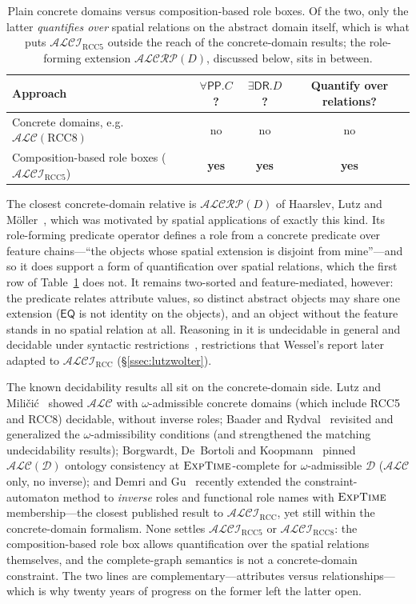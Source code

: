 \documentclass[11pt]{article}
\newcommand{\ALCIRCC}[1]{\mathcal{ALCI}_{\mathrm{RCC#1}}}
\newcommand{\DR}{\mathsf{DR}}
\newcommand{\PP}{\mathsf{PP}}
\newcommand{\EQ}{\mathsf{EQ}}
\newcommand{\EXPTIME}{\textsc{ExpTime}}
\newcommand{\ALC}{\ensuremath{\mathcal{ALC}}}
\theoremstyle{plain}
\theoremstyle{definition}
\begin{document}
\begin{table}[t]
\centering
\small
\renewcommand{\arraystretch}{1.2}
\begin{tabular}{@{}lccc@{}}
\toprule
Approach & $\forall\PP.C$? & $\exists\DR.D$? & Quantify over relations? \\
\midrule
Concrete domains, e.g.\ $\ALC(\text{RCC8})$ & no & no & no \\
Composition-based role boxes ($\ALCIRCC5$) & \textbf{yes} & \textbf{yes} & \textbf{yes} \\
\bottomrule
\end{tabular}
\caption{Plain concrete domains versus composition-based role boxes. Of
the two, only the latter \emph{quantifies over} spatial relations on the
abstract domain itself, which is what puts $\ALCIRCC5$ outside the reach of
the concrete-domain results; the role-forming extension
$\mathcal{ALCRP}(D)$, discussed below, sits in between.}
\label{tab:concrete}
\end{table}

The closest concrete-domain relative is $\mathcal{ALCRP}(D)$ of Haarslev,
Lutz and M\"oller~\cite{HaarslevLutzMoeller1999}, which was motivated by
spatial applications of exactly this kind. Its role-forming predicate
operator defines a role from a concrete predicate over feature chains---``the
objects whose spatial extension is disjoint from mine''---and so it does
support a form of quantification over spatial relations, which the first row
of Table~\ref{tab:concrete} does not. It remains two-sorted and
feature-mediated, however: the predicate relates attribute values, so
distinct abstract objects may share one extension ($\EQ$ is not identity on
the objects), and an object without the feature stands in no spatial
relation at all. Reasoning in it is undecidable in general and decidable
under syntactic restrictions~\cite{HaarslevLutzMoeller1999}, restrictions
that Wessel's report later adapted to $\ALCIRCC{}$
(\S\ref{ssec:lutzwolter}).

The known decidability results all sit on the concrete-domain side. Lutz
and Mili\v{c}i\'{c}~\cite{LutzMilicic2007} showed $\ALC$ with
$\omega$-admissible concrete domains (which include RCC5 and RCC8)
decidable, without inverse roles; Baader and
Rydval~\cite{BaaderRydval2020} revisited and generalized the
$\omega$-admissibility conditions (and strengthened the matching
undecidability results); Borgwardt, De~Bortoli and
Koopmann~\cite{BorgwardtEtAl2024} pinned $\ALC(\mathcal D)$ ontology
consistency at $\EXPTIME$-complete for $\omega$-admissible $\mathcal D$
($\ALC$ only, no inverse); and Demri and Gu~\cite{DemriGu2026} recently
extended the constraint-automaton method to \emph{inverse} roles and
functional role names with $\EXPTIME$ membership---the closest published
result to $\ALCIRCC{}$, yet still within the concrete-domain formalism.
None settles $\ALCIRCC5$ or $\ALCIRCC8$: the composition-based role box
allows quantification over the spatial relations themselves, and the
complete-graph semantics is not a concrete-domain constraint. The two
lines are complementary---attributes versus relationships---which is why
twenty years of progress on the former left the latter open.
\end{document}
